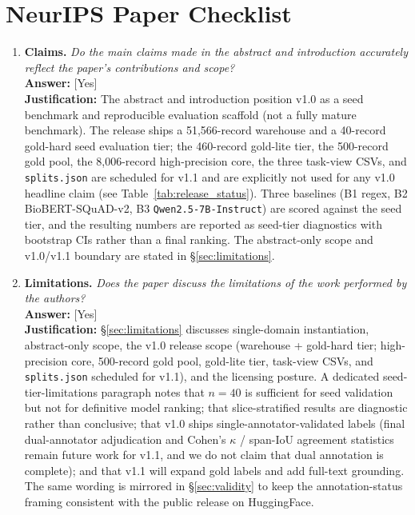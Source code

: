 
\section*{NeurIPS Paper Checklist}

\begin{enumerate}

\item \textbf{Claims.}
\emph{Do the main claims made in the abstract and introduction
accurately reflect the paper's contributions and scope?}\\
\textbf{Answer:} [Yes] \\
\textbf{Justification:} The abstract and introduction position v1.0 as
a seed benchmark and reproducible evaluation scaffold (not a fully
mature benchmark). The release ships a 51{,}566-record warehouse and a
40-record gold-hard seed evaluation tier; the 460-record gold-lite
tier, the 500-record gold pool, the 8{,}006-record high-precision
core, the three task-view CSVs, and \texttt{splits.json} are scheduled
for v1.1 and are explicitly not used for any v1.0 headline claim
(see Table~\ref{tab:release_status}). Three baselines (B1 regex, B2
BioBERT-SQuAD-v2, B3 \texttt{Qwen2.5-7B-Instruct}) are scored against
the seed tier, and the resulting numbers are reported as seed-tier
diagnostics with bootstrap CIs rather than a final ranking. The
abstract-only scope and v1.0/v1.1 boundary are stated in
\S\ref{sec:limitations}.

\item \textbf{Limitations.}
\emph{Does the paper discuss the limitations of the work performed
by the authors?}\\
\textbf{Answer:} [Yes] \\
\textbf{Justification:} \S\ref{sec:limitations} discusses
single-domain instantiation, abstract-only scope, the v1.0 release
scope (warehouse + gold-hard tier; high-precision core, 500-record
gold pool, gold-lite tier, task-view CSVs, and \texttt{splits.json}
scheduled for v1.1), and the licensing posture. A dedicated
seed-tier-limitations paragraph notes that $n=40$ is sufficient for
seed validation but not for definitive model ranking; that
slice-stratified results are diagnostic rather than conclusive; that
v1.0 ships single-annotator-validated labels (final dual-annotator
adjudication and Cohen's $\kappa$ / span-IoU agreement statistics
remain future work for v1.1, and we do not claim that dual annotation
is complete); and that v1.1 will expand gold labels and add full-text
grounding. The same wording is mirrored in \S\ref{sec:validity} to
keep the annotation-status framing consistent with the public release
on HuggingFace.


\end{enumerate}
